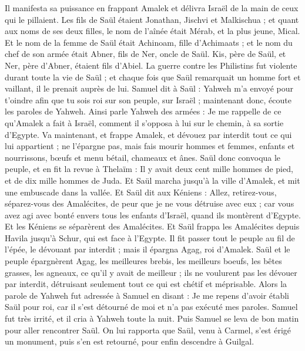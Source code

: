 \begin{multicols}{2}
Il manifesta sa puissance en frappant Amalek et délivra Israël de la main de ceux qui le pillaient.
Les fils de Saül étaient Jonathan, Jischvi et Malkischua ; et quant aux noms de ses deux filles, le nom de l'aînée était Mérab, et la plus jeune, Mical.
Et le nom de la femme de Saül était Achinoam, fille d'Achimaats ; et le nom du chef de son armée était Abner, fils de Ner, oncle de Saül.
Kis, père de Saül, et Ner, père d'Abner, étaient fils d'Abiel.
La guerre contre les Philistins fut violente durant toute la vie de Saül ; et chaque fois que Saül remarquait un homme fort et vaillant, il le prenait auprès de lui.
\VerseOne{}Samuel dit à Saül : Yahweh m'a envoyé pour t'oindre afin que tu sois roi sur son peuple, sur Israël ; maintenant donc, écoute les paroles de Yahweh.
Ainsi parle Yahweh des armées : Je me rappelle de ce qu'Amalek a fait à Israël, comment il s'opposa à lui sur le chemin, à sa sortie d'Egypte.
Va maintenant, et frappe Amalek, et dévouez par interdit tout ce qui lui appartient ; ne l’épargne pas, mais fais mourir hommes et femmes, enfants et nourrissons, bœufs et menu bétail, chameaux et ânes.
Saül donc convoqua le peuple, et en fit la revue à Thelaïm : Il y avait deux cent mille hommes de pied, et de dix mille hommes de Juda.
Et Saül marcha jusqu'à la ville d’Amalek, et mit une embuscade dans la vallée.
Et Saül dit aux Kéniens : Allez, retirez-vous, séparez-vous des Amalécites, de peur que je ne vous détruise avec eux ; car vous avez agi avec bonté envers tous les enfants d'Israël, quand ils montèrent d'Egypte. Et les Kéniens se séparèrent des Amalécites.
Et Saül frappa les Amalécites depuis Havila jusqu'à Schur, qui est face à l'Egypte.
Il fit passer tout le peuple au fil de l'épée, le dévouant par interdit ; mais il épargna Agag, roi d'Amalek.
Saül et le peuple épargnèrent Agag, les meilleures brebis, les meilleurs boeufs, les bêtes grasses, les agneaux, ce qu’il y avait de meilleur ; ils ne voulurent pas les dévouer par interdit, détruisant seulement tout ce qui est chétif et méprisable.
Alors la parole de Yahweh fut adressée à Samuel en disant :
Je me repens d'avoir établi Saül pour roi, car il s’est détourné de moi et n'a pas exécuté mes paroles. Samuel fut très irrité, et il cria à Yahweh toute la nuit.
Puis Samuel se leva de bon matin pour aller rencontrer Saül. On lui rapporta que Saül, venu à Carmel, s'est érigé un monument, puis s'en est retourné, pour enfin descendre à Guilgal.

\end{multicols}
